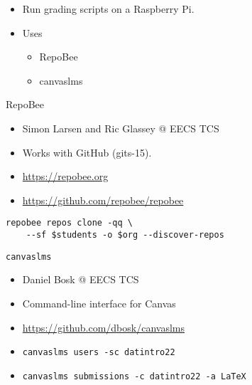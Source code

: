 \begin{frame}[fragile]
  \begin{example}[Grading]
    \begin{itemize}
      \item Run grading scripts on a Raspberry Pi.
      \item Uses
        \begin{itemize}
          \item RepoBee
          \item canvaslms
        \end{itemize}
    \end{itemize}
  \end{example}
\end{frame}

\begin{frame}[fragile]
  \begin{block}{RepoBee}
    \begin{itemize}
      \item Simon Larsen and Ric Glassey @ EECS TCS
      \item Works with GitHub (gits-15).
      \item \url{https://repobee.org}
      \item \url{https://github.com/repobee/repobee}
    \end{itemize}
  \end{block}

  \begin{example}
    \begin{verbatim}
repobee repos clone -qq \
    --sf $students -o $org --discover-repos
    \end{verbatim}
  \end{example}
\end{frame}

\begin{frame}[fragile]
  \begin{block}{\texttt{canvaslms}}
    \begin{itemize}
      \item Daniel Bosk @ EECS TCS
      \item Command-line interface for Canvas
      \item \url{https://github.com/dbosk/canvaslms}
    \end{itemize}
  \end{block}

  \begin{example}
    \begin{itemize}
      \item \texttt{canvaslms users -sc datintro22}
      \item \texttt{canvaslms submissions -c datintro22 -a LaTeX}
    \end{itemize}
  \end{example}
\end{frame}

